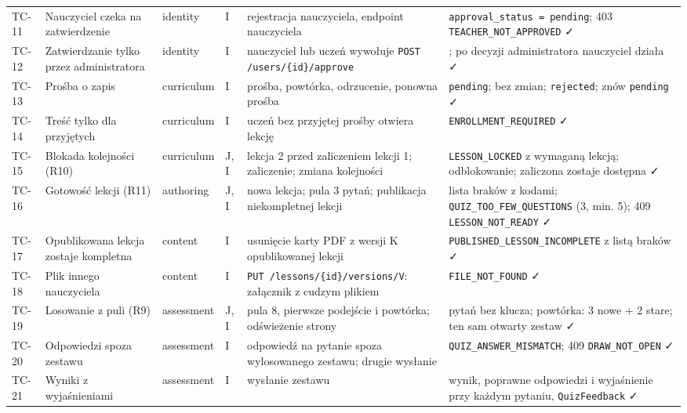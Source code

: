 \begin{longtable}{p{1cm} >{\raggedright\arraybackslash}p{3.2cm} >{\raggedright\arraybackslash}p{1.6cm} p{0.6cm} >{\raggedright\arraybackslash}p{4.3cm} >{\raggedright\arraybackslash}p{4.3cm}}
\addlinespace
\midrule
TC-11 & Nauczyciel czeka na zatwierdzenie & identity & I &
  rejestracja nauczyciela, endpoint nauczyciela &
  \texttt{approval\_status = pending}; 403 \texttt{TEACHER\_NOT\_APPROVED} \faCheck \\
\addlinespace
TC-12 & Zatwierdzanie tylko przez administratora & identity & I &
  nauczyciel lub uczeń wywołuje \texttt{POST /users/\{id\}/approve} &
  403; po decyzji administratora nauczyciel działa \faCheck \\
\addlinespace
TC-13 & Prośba o zapis & curriculum & I &
  prośba, powtórka, odrzucenie, ponowna prośba &
  \texttt{pending}; bez zmian; \texttt{rejected}; znów \texttt{pending} \faCheck \\
\addlinespace
TC-14 & Treść tylko dla przyjętych & curriculum & I &
  uczeń bez przyjętej prośby otwiera lekcję &
  403 \texttt{ENROLLMENT\_REQUIRED} \faCheck \\
\addlinespace
TC-15 & Blokada kolejności (R10) & curriculum & J, I &
  lekcja 2 przed zaliczeniem lekcji 1; zaliczenie; zmiana kolejności &
  403 \texttt{LESSON\_LOCKED} z wymaganą lekcją; odblokowanie; zaliczona zostaje dostępna \faCheck \\
\addlinespace
\midrule
TC-16 & Gotowość lekcji (R11) & authoring & J, I &
  nowa lekcja; pula 3 pytań; publikacja niekompletnej lekcji &
  lista braków z kodami; \texttt{QUIZ\_TOO\_FEW\_QUESTIONS} (3, min. 5); 409 \texttt{LESSON\_NOT\_READY} \faCheck \\
\addlinespace
TC-17 & Opublikowana lekcja zostaje kompletna & content & I &
  usunięcie karty PDF z wersji K opublikowanej lekcji &
  409 \texttt{PUBLISHED\_LESSON\_INCOMPLETE} z listą braków \faCheck \\
\addlinespace
TC-18 & Plik innego nauczyciela & content & I &
  \texttt{PUT /lessons/\{id\}/versions/V}: załącznik z cudzym plikiem &
  400 \texttt{FILE\_NOT\_FOUND} \faCheck \\
\addlinespace
\midrule
TC-19 & Losowanie z puli (R9) & assessment & J, I &
  pula 8, pierwsze podejście i powtórka; odświeżenie strony &
  5 pytań bez klucza; powtórka: 3 nowe + 2 stare; ten sam otwarty zestaw \faCheck \\
\addlinespace
TC-20 & Odpowiedzi spoza zestawu & assessment & I &
  odpowiedź na pytanie spoza wylosowanego zestawu; drugie wysłanie &
  400 \texttt{QUIZ\_ANSWER\_MISMATCH}; 409 \texttt{DRAW\_NOT\_OPEN} \faCheck \\
\addlinespace
TC-21 & Wyniki z wyjaśnieniami & assessment & I &
  wysłanie zestawu &
  wynik, poprawne odpowiedzi i wyjaśnienie przy każdym pytaniu, \texttt{QuizFeedback} \faCheck \\

\end{longtable}
